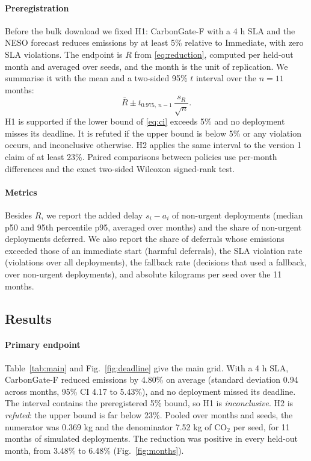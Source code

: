 \documentclass[journal]{IEEEtran}
\begin{document}
\paragraph{Preregistration} Before the bulk download we fixed H1: CarbonGate-F with a 4 h SLA and the NESO forecast reduces emissions by at least 5\% relative to Immediate, with zero SLA violations. The endpoint is $R$ from \eqref{eq:reduction}, computed per held-out month and averaged over seeds, and the month is the unit of replication. We summarise it with the mean and a two-sided 95\% $t$ interval over the $n = 11$ months:
\begin{equation}
\bar R \pm t_{0.975,\,n-1}\, \frac{s_R}{\sqrt{n}} .
\label{eq:ci}
\end{equation}
H1 is supported if the lower bound of \eqref{eq:ci} exceeds 5\% and no deployment misses its deadline. It is refuted if the upper bound is below 5\% or any violation occurs, and inconclusive otherwise. H2 applies the same interval to the version 1 claim of at least 23\%. Paired comparisons between policies use per-month differences and the exact two-sided Wilcoxon signed-rank test.

\paragraph{Metrics} Besides $R$, we report the added delay $s_i - a_i$ of non-urgent deployments (median p50 and 95th percentile p95, averaged over months) and the share of non-urgent deployments deferred. We also report the share of deferrals whose emissions exceeded those of an immediate start (harmful deferrals), the SLA violation rate (violations over all deployments), the fallback rate (decisions that used a fallback, over non-urgent deployments), and absolute kilograms per seed over the 11 months.

\subsection{Results}

\paragraph{Primary endpoint} Table~\ref{tab:main} and Fig.~\ref{fig:deadline} give the main grid. With a 4 h SLA, CarbonGate-F reduced emissions by 4.80\% on average (standard deviation 0.94 across months, 95\% CI 4.17 to 5.43\%), and no deployment missed its deadline. The interval contains the preregistered 5\% bound, so H1 is \emph{inconclusive}. H2 is \emph{refuted}: the upper bound is far below 23\%. Pooled over months and seeds, the numerator was 0.369 kg and the denominator 7.52 kg of CO$_2$ per seed, for 11 months of simulated deployments. The reduction was positive in every held-out month, from 3.48\% to 6.48\% (Fig.~\ref{fig:months}).
\end{document}
